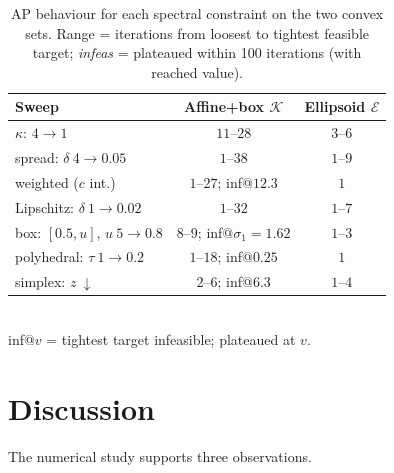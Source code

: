 \documentclass[journal]{IEEEtran}
\newcommand{\sgm}{\sigma}
\newcommand{\Kset}{\mathcal{K}}
\newcommand{\Ellipsoid}{\mathcal{E}}
\begin{document}
\begin{table}[t]
\caption{AP behaviour for each spectral constraint on the two convex
sets. Range = iterations from loosest to tightest feasible target;
\emph{infeas} = plateaued within 100 iterations (with reached value).}
\label{tab:summary}
\centering
\footnotesize
\setlength{\tabcolsep}{4pt}
\begin{tabular}{lcc}
\toprule
Sweep & Affine+box $\Kset$ & Ellipsoid $\Ellipsoid$ \\
\midrule
$\kappa$: $4 \to 1$             & $11$--$28$                      & $3$--$6$ \\
spread: $\delta\ 4 \to 0.05$    & $1$--$38$                       & $1$--$9$ \\
weighted ($c$ int.)             & $1$--$27$; inf@$12.3$           & $1$ \\
Lipschitz: $\delta\ 1 \to 0.02$ & $1$--$32$                       & $1$--$7$ \\
box: $[0.5,u]$, $u\ 5{\to}0.8$  & $8$--$9$; inf@$\sgm_1{=}1.62$   & $1$--$3$ \\
polyhedral: $\tau\ 1 \to 0.2$   & $1$--$18$; inf@$0.25$           & $1$ \\
simplex: $z\ \downarrow$        & $2$--$6$; inf@$6.3$             & $1$--$4$ \\
\bottomrule
\end{tabular}
\\[2pt]
{\footnotesize inf@$v$ = tightest target infeasible; plateaued at $v$.}
\end{table}

\section{Discussion}\label{sec:disc}

The numerical study supports three observations.
\end{document}
